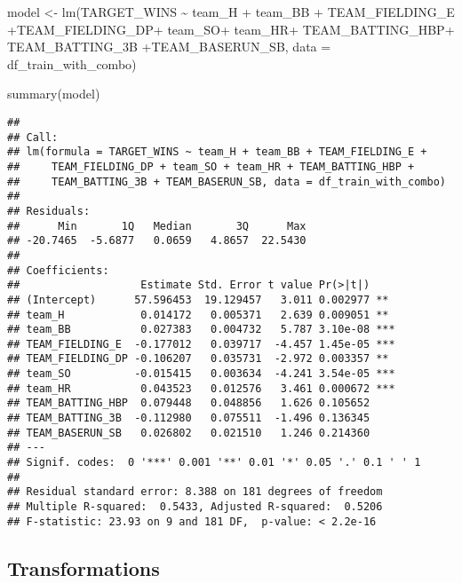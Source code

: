 \documentclass[
]{article}
\newenvironment{Shaded}{\begin{snugshade}}{\end{snugshade}}
\newcommand{\AttributeTok}[1]{\textcolor[rgb]{0.77,0.63,0.00}{#1}}
\newcommand{\FunctionTok}[1]{\textcolor[rgb]{0.00,0.00,0.00}{#1}}
\newcommand{\NormalTok}[1]{#1}
\newcommand{\OtherTok}[1]{\textcolor[rgb]{0.56,0.35,0.01}{#1}}
\newcommand{\SpecialCharTok}[1]{\textcolor[rgb]{0.00,0.00,0.00}{#1}}
\begin{document}
\begin{Shaded}
\begin{Highlighting}[]
\NormalTok{model }\OtherTok{\textless{}{-}} \FunctionTok{lm}\NormalTok{(TARGET\_WINS }\SpecialCharTok{\textasciitilde{}}\NormalTok{ team\_H }\SpecialCharTok{+}\NormalTok{ team\_BB }\SpecialCharTok{+}\NormalTok{ TEAM\_FIELDING\_E }\SpecialCharTok{+}\NormalTok{TEAM\_FIELDING\_DP}\SpecialCharTok{+}\NormalTok{ team\_SO}\SpecialCharTok{+}\NormalTok{ team\_HR}\SpecialCharTok{+}\NormalTok{ TEAM\_BATTING\_HBP}\SpecialCharTok{+}\NormalTok{ TEAM\_BATTING\_3B }\SpecialCharTok{+}\NormalTok{TEAM\_BASERUN\_SB, }\AttributeTok{data =}\NormalTok{ df\_train\_with\_combo)}

\FunctionTok{summary}\NormalTok{(model)}
\end{Highlighting}
\end{Shaded}

\begin{verbatim}
## 
## Call:
## lm(formula = TARGET_WINS ~ team_H + team_BB + TEAM_FIELDING_E + 
##     TEAM_FIELDING_DP + team_SO + team_HR + TEAM_BATTING_HBP + 
##     TEAM_BATTING_3B + TEAM_BASERUN_SB, data = df_train_with_combo)
## 
## Residuals:
##      Min       1Q   Median       3Q      Max 
## -20.7465  -5.6877   0.0659   4.8657  22.5430 
## 
## Coefficients:
##                   Estimate Std. Error t value Pr(>|t|)    
## (Intercept)      57.596453  19.129457   3.011 0.002977 ** 
## team_H            0.014172   0.005371   2.639 0.009051 ** 
## team_BB           0.027383   0.004732   5.787 3.10e-08 ***
## TEAM_FIELDING_E  -0.177012   0.039717  -4.457 1.45e-05 ***
## TEAM_FIELDING_DP -0.106207   0.035731  -2.972 0.003357 ** 
## team_SO          -0.015415   0.003634  -4.241 3.54e-05 ***
## team_HR           0.043523   0.012576   3.461 0.000672 ***
## TEAM_BATTING_HBP  0.079448   0.048856   1.626 0.105652    
## TEAM_BATTING_3B  -0.112980   0.075511  -1.496 0.136345    
## TEAM_BASERUN_SB   0.026802   0.021510   1.246 0.214360    
## ---
## Signif. codes:  0 '***' 0.001 '**' 0.01 '*' 0.05 '.' 0.1 ' ' 1
## 
## Residual standard error: 8.388 on 181 degrees of freedom
## Multiple R-squared:  0.5433, Adjusted R-squared:  0.5206 
## F-statistic: 23.93 on 9 and 181 DF,  p-value: < 2.2e-16
\end{verbatim}

\hypertarget{transformations}{%
\subsection{\texorpdfstring{\textbf{Transformations}}{Transformations}}\label{transformations}}
\end{document}
